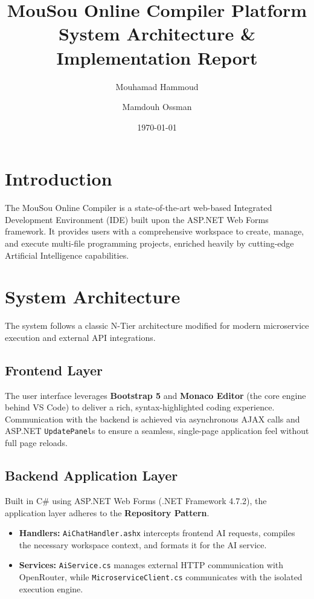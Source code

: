 \documentclass[12pt, a4paper]{article}
\title{\textbf{\textcolor{mousoublue}{MouSou Online Compiler Platform}} \\ System Architecture \& Implementation Report}
\author{Mouhamad Hammoud \and Mamdouh Ossman}
\date{\today}
\begin{document}
\maketitle
\tableofcontents
\newpage

\section{Introduction}
The MouSou Online Compiler is a state-of-the-art web-based Integrated Development Environment (IDE) built upon the ASP.NET Web Forms framework. It provides users with a comprehensive workspace to create, manage, and execute multi-file programming projects, enriched heavily by cutting-edge Artificial Intelligence capabilities.

\section{System Architecture}
The system follows a classic N-Tier architecture modified for modern microservice execution and external API integrations.

\subsection{Frontend Layer}
The user interface leverages \textbf{Bootstrap 5} and \textbf{Monaco Editor} (the core engine behind VS Code) to deliver a rich, syntax-highlighted coding experience. Communication with the backend is achieved via asynchronous AJAX calls and ASP.NET \texttt{UpdatePanel}s to ensure a seamless, single-page application feel without full page reloads.

\subsection{Backend Application Layer}
Built in C\# using ASP.NET Web Forms (.NET Framework 4.7.2), the application layer adheres to the \textbf{Repository Pattern}. 
\begin{itemize}
    \item \textbf{Handlers:} \texttt{AiChatHandler.ashx} intercepts frontend AI requests, compiles the necessary workspace context, and formats it for the AI service.
    \item \textbf{Services:} \texttt{AiService.cs} manages external HTTP communication with OpenRouter, while \texttt{MicroserviceClient.cs} communicates with the isolated execution engine.
\end{itemize}
\end{document}
